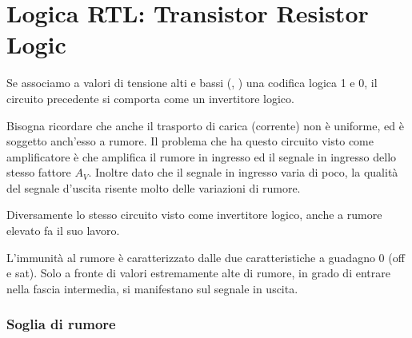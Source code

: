 \documentclass[../template]{subfiles}
\begin{document}
\section{Logica RTL: Transistor Resistor Logic}
Se associamo a valori di tensione alti e bassi (, ) una codifica logica 1 e 0, il circuito precedente si comporta come un invertitore
logico.

Bisogna ricordare che anche il trasporto di carica (corrente) non è uniforme, ed è soggetto anch'esso a rumore.
Il problema che ha questo circuito visto come amplificatore è che amplifica il rumore in ingresso ed il segnale in ingresso dello stesso
fattore $A_V$.
Inoltre dato che il segnale in ingresso varia di poco, la qualità del segnale d'uscita risente molto delle variazioni di rumore.

Diversamente lo stesso circuito visto come invertitore logico, anche a rumore elevato fa il suo lavoro.

L'immunità al rumore è caratterizzato dalle due caratteristiche a guadagno 0 (off e sat). Solo a fronte di valori estremamente alte di rumore, in
grado di entrare nella fascia intermedia, si manifestano sul segnale in uscita.

\subsubsection{Soglia di rumore}
\end{document}
